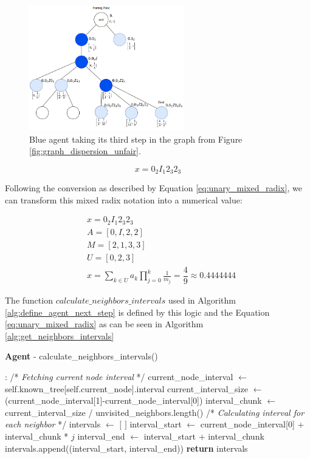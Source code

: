 \begin{figure}[H]
    \centering
    \includegraphics[width=0.6\textwidth]{Cap2/blue_agent_radix_3_step.png}
    \caption{Blue agent taking its third step in the graph from Figure \ref{fig:graph_dispersion_unfair}.}
    \label{fig_blue_agent_step_3}
\end{figure}


\begin{equation}
    x = 0_{2}I_{1}2_{3}2_{3}
\end{equation}

Following the conversion as described by Equation \ref{eq:unary_mixed_radix}, 
we can transform this mixed radix notation into a numerical value:

\begin{align}
    & x=0_{2}I_{1}2_{3}2_{3}\\
    & A=[0,I,2,2]\\
    & M=[2,1,3,3]\\
    & U=[0,2,3]\\
    & x = \sum_{k \in U} a_{k} \prod_{j=0}^{k} \frac{1}{m_j} = \dfrac{4}{9} \approx 0.4444444
\end{align}


The function $calculate\_neighbors\_intervals$ used in Algorithm \ref{alg:define_agent_next_step}
is defined by this logic and the Equation \ref{eq:unary_mixed_radix} as can be seen in Algorithm \ref{alg:get_neighbors_intervals}

\begin{algorithm}
\caption{\textbf{Agent} - calculate\_neighbors\_intervals()}
\label{alg:get_neighbors_intervals}
\begin{algorithmic}
    :
    \State /* \textit{Fetching current node interval } */
    \State current\_node\_interval $\gets$ self.known\_tree[self.current\_node].interval
    \State current\_interval\_size $\gets$ (current\_node\_interval[1]-current\_node\_interval[0])
    \State interval\_chunk $\gets$ current\_interval\_size / unvisited\_neighbors.length()
    \State
    \State /* \textit{Calculating interval for each neighbor} */
    \State intervals $\gets$ $[$ $ ]$
        \State interval\_start $\gets$ current\_node\_interval[0] + interval\_chunk * $j$
        \State interval\_end $\gets$ interval\_start + interval\_chunk
        \State intervals.append((interval\_start, interval\_end))
    \EndFor
    \State \textbf{return} intervals
    \EndProcedure
\end{algorithmic}
\end{algorithm}

